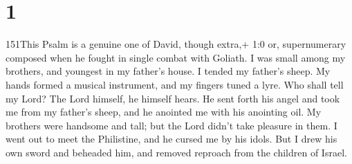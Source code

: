 \hypertarget{section}{%
\section{1}\label{section}}

151This Psalm is a genuine one of David, though extra,+ 1:0 or,
supernumerary composed when he fought in single combat with Goliath.
 I was small among my brothers, and youngest in my father's
house. I tended my father's sheep.  My hands formed a
musical instrument, and my fingers tuned a lyre.  Who shall
tell my Lord? The Lord himself, he himself hears.  He sent
forth his angel and took me from my father's sheep, and he anointed me
with his anointing oil.  My brothers were handsome and tall;
but the Lord didn't take pleasure in them.  I went out to
meet the Philistine, and he cursed me by his idols.  But I
drew his own sword and beheaded him, and removed reproach from the
children of Israel.
